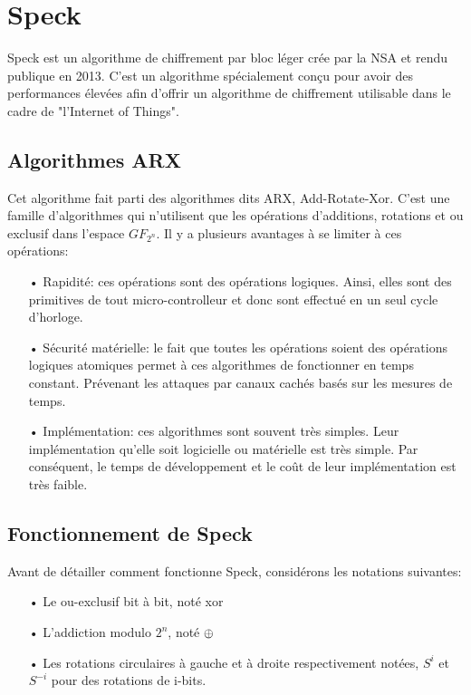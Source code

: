 
		\section{Speck}

			Speck est un algorithme de chiffrement par bloc léger crée par la NSA et rendu
		publique en 2013. C'est un algorithme spécialement conçu pour avoir des performances
		élevées afin d'offrir un algorithme de chiffrement utilisable dans le cadre de
		"l'Internet of Things".

		\subsection{Algorithmes ARX}

				Cet algorithme fait parti des algorithmes dits ARX, Add-Rotate-Xor. C'est une famille
			d'algorithmes qui n'utilisent que les opérations d'additions, rotations et ou exclusif
			dans l'espace $GF_{2^n}$. Il y a plusieurs avantages à se limiter à ces opérations:

			\begin{enumerate}
			\item[•] Rapidité: ces opérations sont des opérations logiques. Ainsi, elles sont
				des primitives de tout micro-controlleur et donc sont effectué en un seul
				cycle d'horloge.
			\item[•] Sécurité matérielle: le fait que toutes les opérations soient des opérations
				logiques atomiques permet à ces algorithmes de fonctionner en temps constant.
				Prévenant les attaques par canaux cachés basés sur les mesures de temps.
			\item[•] Implémentation: ces algorithmes sont souvent très simples. Leur implémentation
				qu'elle soit logicielle ou matérielle est très simple. Par conséquent, le
				temps de développement et le coût de leur implémentation est très faible.
			\end{enumerate}

		\subsection{Fonctionnement de Speck}

			Avant de détailler comment fonctionne Speck, considérons les notations suivantes:

			\begin{enumerate}
			  \item[•] Le ou-exclusif bit à bit, noté xor
			  \item[•] L'addiction modulo $2^n$, noté $\mathbin{\oplus}$
			  \item[•] Les rotations circulaires à gauche et à droite respectivement notées,
			    $S^i$ et $S^{-i}$ pour des rotations de i-bits.
			\end{enumerate}

